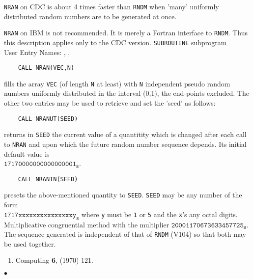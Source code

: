                                
                 
\Submitter{}                                   
\begin{center}
\end{center}
{\tt NRAN} on CDC is about 4 times faster than {\tt RNDM} when 'many'
uniformly distributed random numbers are to be generated at once.
\par
{\tt NRAN} on IBM is not recommended. It is merely a Fortran
interface to {\tt RNDM}. Thus this description applies only to
the CDC version.
\Structure
{\tt SUBROUTINE} subprogram \\
User Entry Names: , , 
\Usage
\begin{verbatim}
    CALL NRAN(VEC,N)
\end{verbatim}
fills the array {\tt VEC} (of length {\tt N} at least) with {\tt N}
independent pseudo random numbers uniformly distributed in the
interval (0,1), the end-points excluded. The other two entries may
be used to retrieve and set the 'seed' as follows:
\begin{verbatim}
    CALL NRANUT(SEED)
\end{verbatim}
returns in {\tt SEED} the current value of a quantitity which is
changed after each call to {\tt NRAN} and upon which the future
random number sequence depends. Its initial default value is \\
$\mathtt{17170000000000000001_8}$.
\begin{verbatim}
    CALL NRANIN(SEED)
\end{verbatim}
presets the above-mentioned quantity to {\tt SEED}.
{\tt SEED} may be any number of the form \\
$\mathtt{ 1717xxxxxxxxxxxxxxxy_8}$ where {\tt y} must be {\tt 1} or {\tt 5}
and the {\tt x}'s any octal digits.
\Method
Multiplicative congruential method with the multiplier
$\mathtt{ 20001170673633457725_8}$. The sequence generated is independent
of that of {\tt RNDM} (V104) so that both may be used together.
\Refer
\begin{enumerate}
\item Computing {\bf 6}, (1970) 121.
\end{enumerate}
$\bullet$
